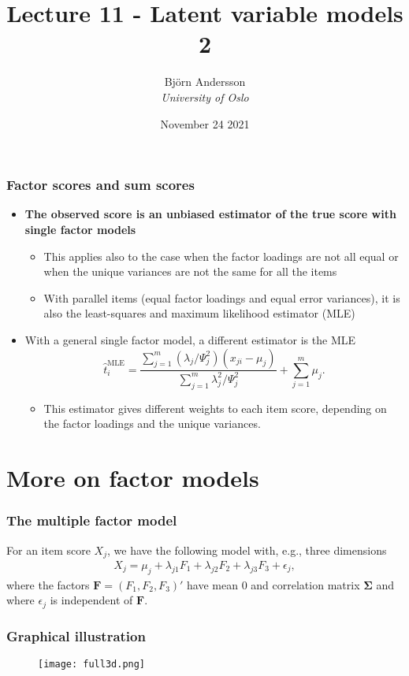 \documentclass[compress]{beamer}
\title{Lecture 11 - Latent variable models 2}
\author[]{Bj\"{o}rn Andersson \\\vspace{6pt} {\em{University of Oslo}} }
\date{November 24 2021}
\begin{document}
\begin{frame}[fragile]
\titlepage
\end{frame}

\begin{frame}[fragile]
\frametitle{Factor scores and sum scores}
\begin{itemize}
\item \textbf{The observed score is an unbiased estimator of the true score with single factor models}
\begin{itemize}
\item This applies also to the case when the factor loadings are not all equal or when the unique variances are not the same for all the items
\item With parallel items (equal factor loadings and equal error variances), it is also the least-squares and maximum likelihood estimator (MLE)
\end{itemize}
\item With a general single factor model, a different estimator is the MLE
\[
\hat{t}_i^{\text{MLE}} = \frac{\sum_{j=1}^m(\lambda_j / \Psi_j^2)(x_{ji}-\mu_j)}{\sum_{j=1}^m\lambda_j^2 / \Psi_j^2} + \sum_{j=1}^m \mu_j.
\]
\begin{itemize}
\item This estimator gives different weights to each item score, depending on the factor loadings and the unique variances.
\end{itemize}
\end{itemize}
\end{frame}


\section{More on factor models}
\begin{frame}[fragile]
\frametitle{The multiple factor model}
For an item score $X_j$, we have the following model with, e.g., three dimensions
\begin{align*}
X_j = \mu_j + \lambda_{j1}F_1 + \lambda_{j2}F_2 + \lambda_{j3}F_3 + \epsilon_j,
\end{align*}
where the factors $\boldsymbol F = (F_1, F_2, F_3)'$ have mean 0 and correlation matrix $\boldsymbol\Sigma$ and where $\epsilon_j$ is independent of $\boldsymbol F$.
\end{frame}

\begin{frame}[fragile]
\frametitle{Graphical illustration}
\begin{figure}
\centering
\texttt{[image: full3d.png]}
\end{figure}
\end{frame}
\end{document}
